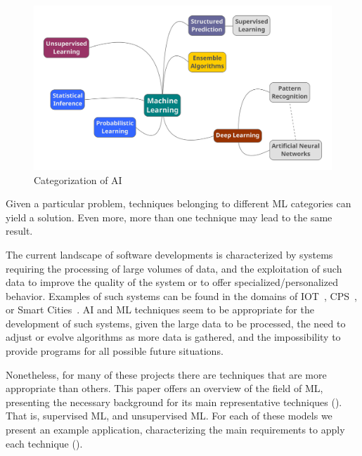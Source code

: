 \begin{figure}[htbp]
  \centering
  \includegraphics[width=\textwidth]{images/ai-categorization}
  \caption{Categorization of \ac{AI}}
  \label{fig:ai-categorization}
\end{figure}

Given a particular problem, techniques belonging to different \ac{ML} categories can yield a solution. 
Even more, more than one technique may lead to the same result. 

The current landscape of software developments is characterized by systems requiring the processing 
of large volumes of data, and the exploitation of such data to improve the quality of the system or to 
offer specialized/personalized behavior. Examples of such systems can be found in the domains of 
\ac{IOT}~\cite{mattern10}, \acs{CPS}~\cite{holzl15}, or Smart Cities~\cite{zanella14}. \ac{AI} and 
\ac{ML} techniques seem to be appropriate for the development of such systems, given the large 
data to be processed, the need to adjust or evolve algorithms as more data is gathered, and the 
impossibility to provide programs for all possible future situations. 

Nonetheless, for many of these projects there are techniques that are more appropriate than others.
This paper offers an overview of the field of \ac{ML}, presenting the necessary background for its 
main representative techniques (). That is, supervised \ac{ML}, and unsupervised 
\ac{ML}. For each of these models we present an example application, characterizing the main 
requirements to apply each technique ().


\endinput

Machine Learning has become a topic of interest because of its large field of application (deepen). Artificial intelligence is a broad area of knowledge comprised with several branches where each one has a different configuration and purpose. As a result, we consider one question: what field should a new user start working with if the goal is to classify information from a specific data set? Our work responds to this question based on empirical experimentation where we identified that approaching Machine Learning through supervised linear regression models allows users to understand the basic applications while fulfilling their objective. Moreover, due to available resources such as high level TensorFlow Estimator API and the column-oriented data analysis API Pandas learning doesn’t require long(subjective) before the user can start working on Machine Learning projects. 

